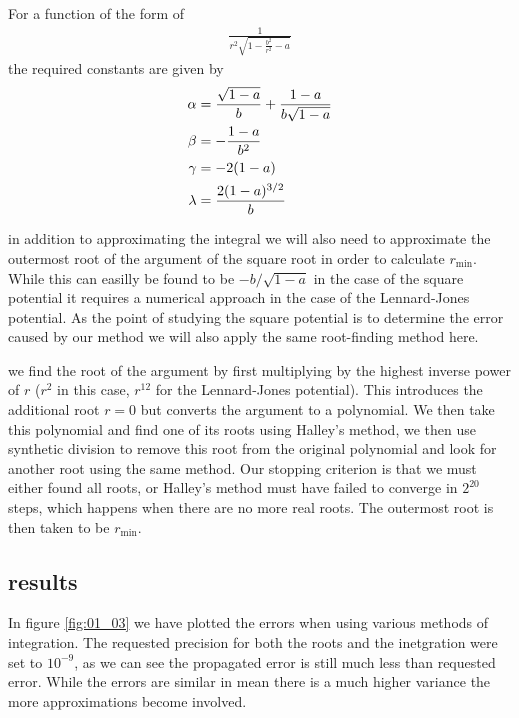 \par For a function of the form of
\begin{align}
  \frac{1}{r^2\sqrt{1-\frac{b^2}{r^2}-a}}
\end{align}
the required constants are given by
\begin{align}
  \alpha &= \frac{\sqrt{1-a}}{b}+\frac{1-a}{b\sqrt{1-a}}\\\nonumber
  \beta &= -\frac{1-a}{b^2}\\\nonumber
  \gamma &= -2(1-a)\\\nonumber
  \lambda &= \frac{2(1-a)^{3/2}}{b}
\end{align}

\par in addition to approximating the integral we will also need to approximate the outermost root of the argument of the square root in order to calculate $r_\text{min}$.
While this can easilly be found to be $-b/\sqrt{1-a}$ in the case of the square potential it requires a numerical approach in the case of the Lennard-Jones potential.
As the point of studying the square potential is to determine the error caused by our method we will also apply the same root-finding method here.
\par we find the root of the argument by first multiplying by the highest inverse power of $r$ ($r^2$ in this case, $r^{12}$ for the Lennard-Jones potential). This introduces the additional root $r=0$ but converts the argument to a polynomial.
We then take this polynomial and find one of its roots using Halley's method, we then use synthetic division to remove this root from the original polynomial and look for another root using the same method. Our stopping criterion is that we must either found all roots, or
Halley's method must have failed to converge in $2^{20}$ steps, which happens when there are no more real roots. The outermost root is then taken to be $r_\text{min}$.

\subsection{results}
In figure \ref{fig:01_03} we have plotted the errors when using various methods of integration. The requested precision for both the roots and the inetgration were set to $10^{-9}$, as we can see the propagated error is still much less than requested error. While the errors
are similar in mean there is a much higher variance the more approximations become involved.

